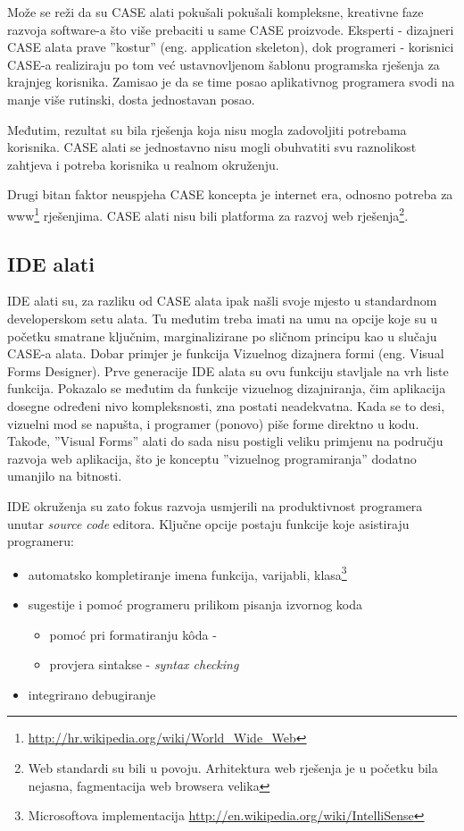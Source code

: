 \documentclass[times, utf8, seminar]{fit}
\begin{document}
Može se reži da su CASE alati pokušali pokušali kompleksne, kreativne faze razvoja software-a što više prebaciti u same CASE proizvode. Eksperti - dizajneri CASE alata prave ''kostur'' (eng. application skeleton), dok programeri - korisnici CASE-a realiziraju po tom već ustavnovljenom šablonu programska rješenja za krajnjeg korisnika. Zamisao je da se time posao aplikativnog programera svodi na manje više rutinski, dosta jednostavan posao.

Međutim, rezultat su bila rješenja koja nisu mogla zadovoljiti potrebama korisnika. CASE alati se jednostavno nisu mogli obuhvatiti svu raznolikost zahtjeva i potreba korisnika u realnom okruženju.

Drugi bitan faktor neuspjeha CASE koncepta je internet era, odnosno potreba za www\footnote{\url{http://hr.wikipedia.org/wiki/World_Wide_Web}} rješenjima. CASE alati nisu bili platforma za razvoj web rješenja\footnote{Web standardi su bili u povoju. Arhitektura web rješenja je u početku bila nejasna, fagmentacija web browsera velika}.

\subsection{IDE alati}

IDE alati su, za razliku od CASE alata ipak našli svoje mjesto u standardnom developerskom setu alata. Tu međutim treba imati na umu na opcije koje su u početku smatrane ključnim, marginalizirane po sličnom principu kao u slučaju CASE-a alata. Dobar primjer je funkcija Vizuelnog dizajnera formi (eng. Visual Forms Designer). Prve generacije IDE alata su ovu funkciju stavljale na vrh liste funkcija. Pokazalo se međutim da funkcije vizuelnog dizajniranja, čim aplikacija dosegne određeni nivo kompleksnosti, zna postati neadekvatna. Kada se to desi, vizuelni mod se napušta, i programer (ponovo) piše forme direktno u kodu. Takođe, ''Visual Forms'' alati do sada nisu postigli veliku primjenu na području razvoja web aplikacija, što je konceptu ''vizuelnog programiranja'' dodatno umanjilo na bitnosti. 

IDE okruženja su zato fokus razvoja usmjerili na produktivnost programera unutar \emph{source code} editora. Ključne opcije postaju funkcije koje asistiraju programeru:
\begin{itemize}
  \item automatsko kompletiranje imena funkcija, varijabli, klasa\footnote{Microsoftova implementacija \url{http://en.wikipedia.org/wiki/IntelliSense}}
  \item sugestije i pomoć programeru prilikom pisanja izvornog koda 
     \begin{itemize}
        \item pomoć pri formatiranju k\^oda - 
        \item provjera sintakse - \emph{syntax checking}
      \end{itemize}
  \item integrirano debugiranje
\end{itemize}
\end{document}
